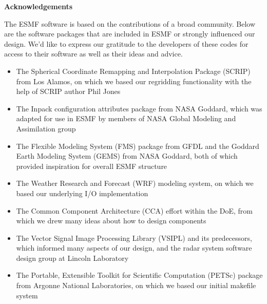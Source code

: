 
\vspace{2in}
\begin{center}
{\bf Acknowledgements}
\end{center}

The ESMF software is based on the contributions of a broad community.
Below are the software packages that are included in ESMF or strongly 
influenced our design.  We'd like to express our gratitude to the 
developers of these codes for access to their software as well as their 
ideas and advice.

\begin{itemize}

\item The Spherical Coordinate Remapping and Interpolation Package (SCRIP) 
from Los Alamos, on which we based our regridding functionality with the
help of SCRIP author Phil Jones

\item The Inpack configuration attributes package from NASA Goddard, 
which was adapted for use in ESMF by members of NASA Global Modeling and 
Assimilation group

\item The Flexible Modeling System (FMS) package from GFDL and the 
Goddard Earth Modeling System (GEMS) from NASA Goddard, both of which 
provided inspiration for overall ESMF structure

\item The Weather Research and Forecast (WRF) modeling system, on which 
we based our underlying I/O implementation

\item The Common Component Architecture (CCA) effort within the DoE,
from which we drew many ideas about how to design components

\item The Vector Signal Image Processing Library (VSIPL) and its
predecessors, which informed many aspects of our design, and the 
radar system software design group at Lincoln Laboratory

\item The Portable, Extensible Toolkit for Scientific Computation (PETSc) 
package from Argonne National Laboratories, on which we 
based our initial makefile system

\end{itemize}